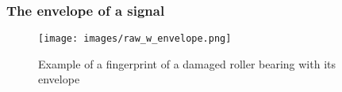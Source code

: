 \begin{frame}
    \frametitle{The envelope of a signal}
    \small
    
    \begin{figure}
        \centering
        \texttt{[image: images/raw\_w\_envelope.png]}
        \caption{Example of a fingerprint of a damaged roller bearing with its envelope}
        \label{fig:spectrum}
    \end{figure}
   
\end{frame}
